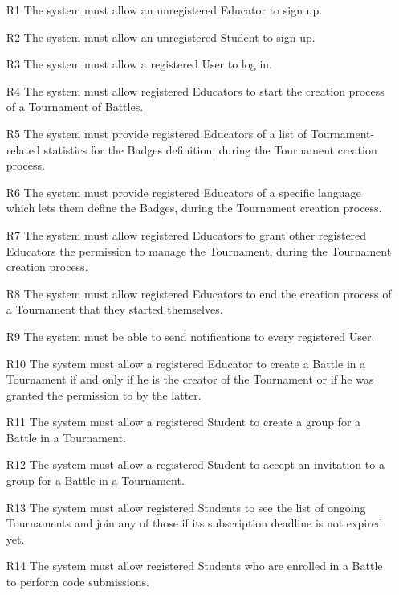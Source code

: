 \documentclass{Configuration_Files/Template}
\begin{document}
\begin{enumerate}
    \item[\textcolor{bluepoli}{R1}] The system must allow an unregistered Educator to sign up.
    \item[\textcolor{bluepoli}{R2}] The system must allow an unregistered Student to sign up.
    \item[\textcolor{bluepoli}{R3}] The system must allow a registered User to log in.
    \item[\textcolor{bluepoli}{R4}] The system must allow registered Educators to start the creation process of a Tournament of Battles.
    \item[\textcolor{bluepoli}{R5}] The system must provide registered Educators of a list of Tournament-related statistics for the Badges definition, during the Tournament creation process.
    \item[\textcolor{bluepoli}{R6}] The system must provide registered Educators of a specific language which lets them define the Badges, during the Tournament creation process.
    \item[\textcolor{bluepoli}{R7}] The system must allow registered Educators to grant other registered Educators the permission to manage the Tournament, during the Tournament creation process.
    \item[\textcolor{bluepoli}{R8}] The system must allow registered Educators to end the creation process of a Tournament that they started themselves.
    \item[\textcolor{bluepoli}{R9}] The system must be able to send notifications to every registered User.
    \item[\textcolor{bluepoli}{R10}] The system must allow a registered Educator to create a Battle in a Tournament if and only if he is the creator of the Tournament or if he was granted the permission to by the latter.
    \item[\textcolor{bluepoli}{R11}] The system must allow a registered Student to create a group for a Battle in a Tournament.
    \item[\textcolor{bluepoli}{R12}] The system must allow a registered Student to accept an invitation to a group for a Battle in a Tournament.
    \item[\textcolor{bluepoli}{R13}] The system must allow registered Students to see the list of ongoing Tournaments and join any of those if its subscription deadline is not expired yet.
    \item[\textcolor{bluepoli}{R14}] The system must allow registered Students who are enrolled in a Battle to perform code submissions.

\end{enumerate}
\end{document}
